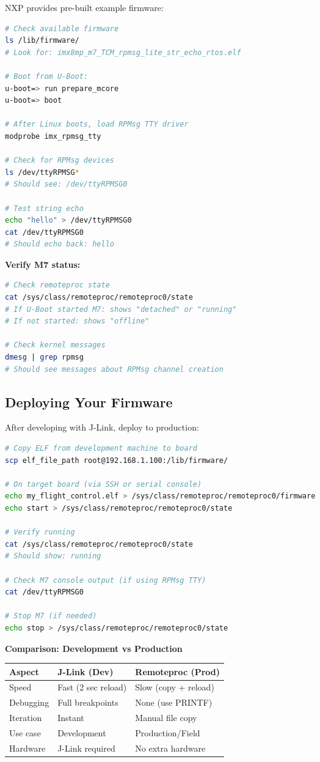 \documentclass[12pt,a4paper]{report}
\begin{document}
NXP provides pre-built example firmware:

\begin{lstlisting}[language=bash]
# Check available firmware
ls /lib/firmware/
# Look for: imx8mp_m7_TCM_rpmsg_lite_str_echo_rtos.elf

# Boot from U-Boot:
u-boot=> run prepare_mcore
u-boot=> boot

# After Linux boots, load RPMsg TTY driver
modprobe imx_rpmsg_tty

# Check for RPMsg devices
ls /dev/ttyRPMSG*
# Should see: /dev/ttyRPMSG0

# Test string echo
echo "hello" > /dev/ttyRPMSG0
cat /dev/ttyRPMSG0
# Should echo back: hello
\end{lstlisting}

\textbf{Verify M7 status:}
\begin{lstlisting}[language=bash]
# Check remoteproc state
cat /sys/class/remoteproc/remoteproc0/state
# If U-Boot started M7: shows "detached" or "running"
# If not started: shows "offline"

# Check kernel messages
dmesg | grep rpmsg
# Should see messages about RPMsg channel creation
\end{lstlisting}

\subsection{Deploying Your Firmware }

After developing with J-Link, deploy to production:

\begin{lstlisting}[language=bash]
# Copy ELF from development machine to board
scp elf_file_path root@192.168.1.100:/lib/firmware/

# On target board (via SSH or serial console)
echo my_flight_control.elf > /sys/class/remoteproc/remoteproc0/firmware
echo start > /sys/class/remoteproc/remoteproc0/state

# Verify running
cat /sys/class/remoteproc/remoteproc0/state
# Should show: running

# Check M7 console output (if using RPMsg TTY)
cat /dev/ttyRPMSG0

# Stop M7 (if needed)
echo stop > /sys/class/remoteproc/remoteproc0/state
\end{lstlisting}

\textbf{Comparison: Development vs Production}

\begin{center}
\begin{tabular}{|l|l|l|}
\hline
\textbf{Aspect} & \textbf{J-Link (Dev)} & \textbf{Remoteproc (Prod)} \\
\hline
Speed & Fast (2 sec reload) & Slow (copy + reload) \\
\hline
Debugging & Full breakpoints & None (use PRINTF) \\
\hline
Iteration & Instant & Manual file copy \\
\hline
Use case & Development & Production/Field \\
\hline
Hardware & J-Link required & No extra hardware \\
\hline
\end{tabular}
\end{center}
\end{document}
